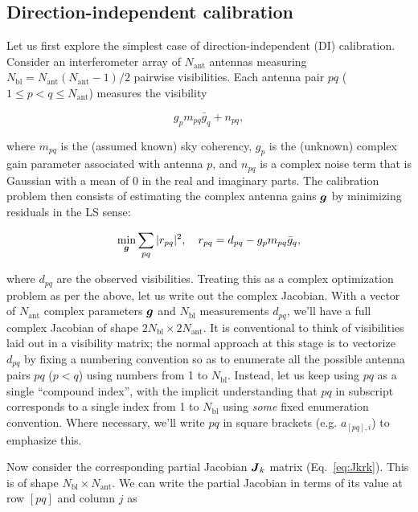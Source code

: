 \documentclass[useAMS,usenatbib]{mn2e}
\newcommand{\mat}[1]{{\bmath{#1}}}
\newcommand{\JJ}{\mat{J}} %
\begin{document}
\subsection{Direction-independent calibration}
\label{sec:unpol:DI}

\newcommand{\Na}{N_\mathrm{ant}}
\newcommand{\Nbl}{N_\mathrm{bl}}
\newcommand{\Nd}{N_\mathrm{dir}}

Let us first explore the simplest case of direction-independent (DI) calibration. Consider an interferometer
array of $\Na$ antennas measuring $\Nbl=\Na(\Na-1)/2$ pairwise visibilities. Each antenna pair $pq$ ($1\leq p<q\leq \Na$) 
measures the visibility

\begin{equation}
\label{eq:RIME:unpol}
g_p m_{pq} \bar{g}_q + n_{pq},
\end{equation}

where $m_{pq}$ is the (assumed known) sky coherency, $g_p$ is the (unknown) complex gain parameter 
associated with antenna $p$, and $n_{pq}$ is a complex noise term that is Gaussian with a mean of 0 in the real and 
imaginary parts. The calibration problem then consists of estimating the complex antenna gains $\bmath{g}$ by
minimizing residuals in the LS sense:

\begin{equation}
\label{eq:cal:DI}
\min_{\bmath{g}}\sum_{pq}|r_{pq}|^2,~~~r_{pq}=d_{pq}-g_p m_{pq} \bar{g}_q, 
\end{equation}

where $d_{pq}$ are the observed visibilities. Treating this as a complex optimization problem as per the above, 
let us write out the complex Jacobian. 
With a vector of $\Na$ complex parameters $\bmath{g}$ and $\Nbl$ measurements $d_{pq}$, we'll have a full complex
Jacobian of shape $2\Nbl\times2\Na$. It is conventional
to think of visibilities laid out in a visibility matrix; the normal approach at this stage is to vectorize $d_{pq}$ 
by fixing a numbering convention so as to enumerate all the possible antenna pairs $pq$ ($p<q$) using numbers from 1 to $\Nbl$.
Instead, let us keep using $pq$ as a single ``compound index'', with the implicit understanding that $pq$ in 
subscript corresponds to a single index from 1 to $\Nbl$ using \emph{some} fixed enumeration convention. 
Where necessary, we'll write $pq$ in square brackets (e.g. $a_{[pq],i}$) to emphasize this.

Now consider the corresponding partial Jacobian $\JJ_k$ matrix (Eq.~\ref{eq:Jkrk}). This is of shape $\Nbl\times\Na$. We can write the
partial Jacobian in terms of its value at row $[pq]$ and column $j$ as 
\end{document}
